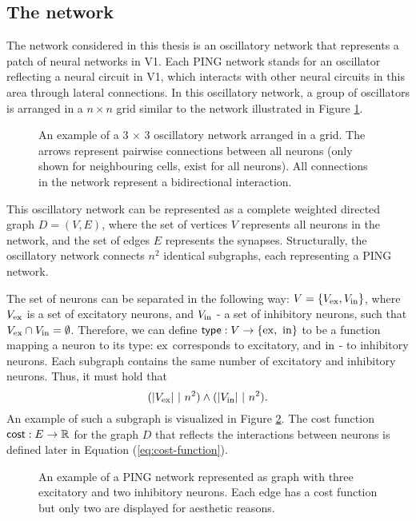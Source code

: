 \subsection{The network}
\label{sec:grid-network}

The network considered in this thesis is an oscillatory network that represents a patch of neural networks in V1. Each PING network stands for an oscillator reflecting a neural circuit in V1, which interacts with other neural circuits in this area through lateral connections.
In this oscillatory network, a group of oscillators is arranged in a $n \times n$ grid similar to the network illustrated in Figure \ref{fig:oscillatory-grid-graph}.

\begin{figure}[!htp]
    \centering
    
    \caption{An example of a 3 $\times$ 3 oscillatory network arranged in a grid. The arrows represent pairwise connections between all neurons (only shown for neighbouring cells, exist for all neurons). All connections in the network represent a bidirectional interaction.}
    \label{fig:oscillatory-grid-graph}
\end{figure}

This oscillatory network can be represented as a complete weighted directed graph $D = (V, E)$, where the set of vertices $V$ represents all neurons in the network, and the set of edges $E$ represents the synapses. Structurally, the oscillatory network connects $n^2$ identical subgraphs, each representing a PING network. 

The set of neurons can be separated in the following way: $V = \{ V_{\mathrm{ex}}, V_{\mathrm{in}}\}$, where $V_{\mathrm{ex}}$ is a set of excitatory neurons, and $V_{\mathrm{in}}$ - a set of inhibitory neurons, such that $V_{\mathrm{ex}} \cap V_{\mathrm{in}} = \emptyset$.
Therefore, we can define $\mathsf{type}: V \to \{ \mathrm{ex}, \ \mathrm{in} \}$ to be a function mapping a neuron to its type: $\mathrm{ex}$ corresponds to excitatory, and $\mathrm{in}$ - to inhibitory neurons. Each subgraph contains the same number of excitatory and inhibitory neurons. Thus, it must hold that
\begin{equation}
    (|V_{\mathrm{ex}}| \ | \ n^2) \land (|V_{\mathrm{in}}| \ | \ n^2).
\end{equation}
An example of such a subgraph is visualized in Figure \ref{fig:single-ping-graph}. 
The cost function $\mathsf{cost}: E \to \mathbb{R}$ for the graph $D$ that reflects the interactions between neurons is defined later in Equation (\ref{eq:cost-function}).

\begin{figure}[!htp]
    \centering
    
    \caption{An example of a PING network represented as graph with three excitatory and two inhibitory neurons. Each edge has a cost function but only two are displayed for aesthetic reasons.}
    \label{fig:single-ping-graph}
\end{figure}

